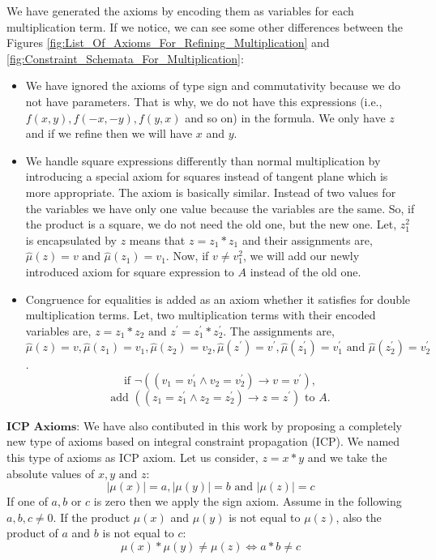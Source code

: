 \noindent We have generated the axioms by encoding them as variables for each multiplication term.
If we notice, we can see some other differences between the Figures \ref{fig:List_Of_Axioms_For_Refining_Multiplication} and \ref{fig:Constraint_Schemata_For_Multiplication}:

\begin{itemize}
    \item We have ignored the axioms of type sign and commutativity because we do not have parameters.
    That is why, we do not have this expressions (i.e., $f(x, y), f(-x, -y), f(y, x)$ and so on) in the formula.
    We only have $z$ and if we refine then we will have $x$ and $y$.
    \item We handle square expressions differently than normal multiplication by introducing a special axiom for squares instead of tangent plane which is more appropriate.
    The axiom is basically similar.
    Instead of two values for the variables we have only one value because the variables are the same.
    So, if the product is a square, we do not need the old one, but the new one.
    Let, $z_1^2$ is encapsulated by $z$ means that $z = z_1 \ast z_1$ and their assignments are, $\hat{\mu}(z) = v \text{ and } \hat{\mu}(z_1) = v_1$.
    Now, if $v \neq v_1^2$, we will add our newly introduced axiom for square expression to $A$ instead of the old one.
    \item Congruence for equalities is added as an axiom whether it satisfies for double multiplication terms. 
    Let, two multiplication terms with their encoded variables are, $z = z_1 \ast z_2 \text{ and } z^\prime = z_1^\prime \ast z_2^\prime$. 
    The assignments are, $\hat{\mu}(z) = v, \hat{\mu}(z_1) = v_1, \hat{\mu}(z_2) = v_2, \hat{\mu}(z^\prime) = v^\prime, \hat{\mu}(z_1^\prime) = v_1^\prime \text{ and } \hat{\mu}(z_2^\prime) = v_2^\prime$.
    $$\text{if } \neg((v_1 = v_1^\prime \wedge v_2 = v_2^\prime) \to v = v^\prime),$$
    $$\text{add } ((z_1 = z_1^\prime \wedge z_2 = z_2^\prime) \to z = z^\prime) \text{ to } A.$$
\end{itemize}

\noindent $\textbf{ICP Axioms:}$ We have also contibuted in this work by proposing a completely new type of axioms based on integral constraint propagation (ICP).
We named this type of axioms as ICP axiom.
Let us consider, $z = x*y$ and we take the absolute values of $x, y \text{ and } z$:
$$|\mu(x)| = a, |\mu(y)| = b \text{ and } |\mu(z)| = c$$
If one of $a, b$ or $c$ is zero then we apply the sign axiom.
Assume in the following $a, b, c \neq 0$.
If the product $\mu(x)$ and $\mu(y)$ is not equal to $\mu(z)$, also the product of $a$ and $b$ is not equal to $c$:
$$\mu(x) \ast \mu(y) \neq \mu(z) \iff a \ast b \neq c$$


